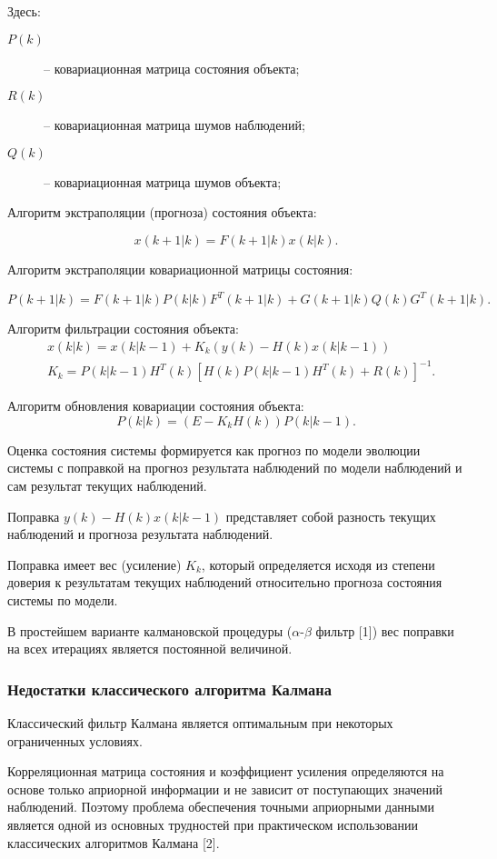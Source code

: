 \documentclass[a4paper,12pt]{article}
\begin{document}
Здесь:
\begin{description}
	\item [$P(k)$] -- ковариационная матрица состояния объекта;
	\item [$R(k)$] -- ковариационная матрица шумов наблюдений;
	\item [$Q(k)$] -- ковариационная матрица шумов объекта;
\end{description}

Алгоритм экстраполяции (прогноза) состояния объекта:

\[ x(k+1|k) = F(k+1|k)x(k|k). \]

Алгоритм экстраполяции ковариационной матрицы состояния:

\[ P(k+1|k) = F(k+1|k)P(k|k)F^T(k+1|k) + G(k+1|k)Q(k)G^T(k+1|k). \]

Алгоритм фильтрации состояния объекта:
\[ 
	\begin{array}{cl}
	&x(k|k) = x(k|k-1) + K_k (y(k) - H(k) x(k|k-1)) \\
	&K_k = P(k|k-1) H^T(k) {[ H(k) P(k|k-1) H^T(k) + R(k)]}^{-1}.
	\end{array}
\]

Алгоритм обновления ковариации состояния объекта:
\[
	P(k|k) = (E - K_k H(k)) P(k|k-1).
\]

Оценка состояния системы формируется как прогноз по модели эволюции системы
с поправкой на прогноз результата наблюдений по модели наблюдений и сам
результат текущих наблюдений.

Поправка $y(k) - H(k)x(k|k-1)$ представляет собой разность текущих наблюдений
и прогноза результата наблюдений.

Поправка имеет вес (усиление) $K_k$, который определяется исходя из степени
доверия к результатам текущих наблюдений относительно прогноза состояния
системы по модели.

В простейшем варианте калмановской процедуры ($\alpha$-$\beta$ фильтр [1]) вес
поправки на всех итерациях является постоянной величиной.

\subsubsection{Недостатки классического алгоритма Калмана}

Классический фильтр Калмана является оптимальным при некоторых ограниченных
условиях.

Корреляционная матрица состояния и коэффициент усиления определяются на основе
только априорной информации и не зависит от поступающих значений наблюдений.
Поэтому проблема обеспечения точными априорными данными является одной из
основных трудностей при практическом использовании классических алгоритмов
Калмана [2].
\end{document}

